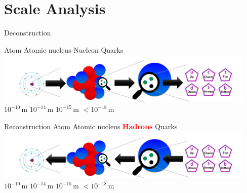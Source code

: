 \section{Scale Analysis}
\begin{frame}{Deconstruction}

    \hspace{1.0cm} Atom \hspace{0.7cm} Atomic nucleus \hspace{1.0cm} Nucleon \hspace{1cm} Quarks\\\vspace{1cm}
     \includegraphics[width=12.5cm]{Figures Lecture on Hadrons/Scale Atom_Quark_updown-approach.png}\\\vspace{1cm}
   \hspace{1.1cm} $10^{-10}$\,m \hspace{1.2cm}  $10^{-14}$\,m  \hspace{1.5cm}  $10^{-15}$\,m  \hspace{1.3cm}  $<10^{-18}$\,m

\end{frame}
\begin{frame}{Reconstruction}
     \hspace{1.0cm} Atom \hspace{0.7cm} Atomic nucleus \hspace{1.0cm} \textbf{\textcolor{red}{Hadrons}} \hspace{1cm} Quarks\\\vspace{1cm}
     \includegraphics[width=12.5cm]{Figures Lecture on Hadrons/Scale Atom_Quark_downup-approach.png}\\\vspace{1cm}
   \hspace{1.1cm} $10^{-10}$\,m \hspace{1.2cm}  $10^{-14}$\,m  \hspace{1.5cm}  $10^{-15}$\,m  \hspace{1.3cm}  $<10^{-18}$\,m
\end{frame}
